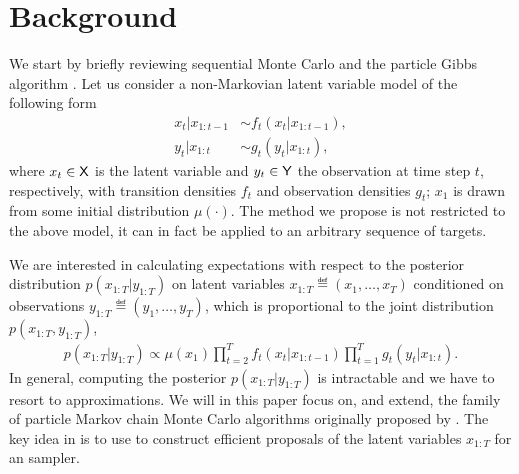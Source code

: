 
\section{Background}
\label{sec:ipmcmc:background}
We start by briefly reviewing sequential Monte Carlo \citep{gordon1993novel,doucet2001sequential} and the particle Gibbs algorithm \citep{andrieuDH2010}. Let us consider a non-Markovian latent variable model of the following form
\begin{subequations}
	\label{eq:ssm}
	\begin{alignat}{2}
	x_t | x_{1:t-1} &\sim f_t(x_t | x_{1:t-1}), \\
	y_t | x_{1:t} &\sim g_t(y_t|x_{1:t}),
	\end{alignat}
\end{subequations}
where $x_t \in \mathsf{X}$ is the latent variable and $y_t \in \mathsf{Y}$ the observation at time step $t$, respectively,
with transition densities $f_t$ and observation densities $g_t$; $x_1$ is drawn from some initial distribution $\mu(\cdot)$. The method we propose is not restricted to the above model, it can in fact be applied to an arbitrary sequence of targets.


We are interested in calculating expectations with respect to the posterior distribution $p(x_{1:T}|y_{1:T})$ on latent variables $x_{1:T} \eqdef (x_1,\ldots,x_T)$ conditioned on observations $y_{1:T} \eqdef (y_1,\ldots,y_T)$, which is proportional to the joint distribution $p(x_{1:T}, y_{1:T})$,
\begin{align}
\label{eq:jointdistribution}
p(x_{1:T} | y_{1:T}) \propto  \mu(x_1) \prod_{t=2}^T f_t(x_t | x_{1:t-1}) \prod_{t=1}^T g_t(y_t|x_{1:t}).\nonumber
\end{align}
In general, computing the posterior $p(x_{1:T}|y_{1:T})$ is intractable and we have to resort to approximations. We will in this paper focus on, and extend, the family of particle Markov chain Monte Carlo algorithms originally proposed by \citet{andrieuDH2010}. The key idea in \pmcmc is to use \smc to construct efficient proposals of the latent variables $x_{1:T}$ for an \mcmc sampler.

